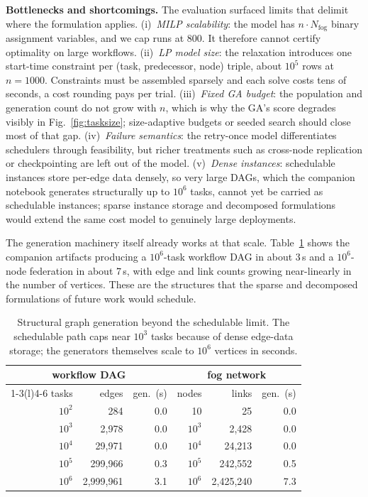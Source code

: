 \documentclass[conference]{IEEEtran}
\begin{document}
\textbf{Bottlenecks and shortcomings.} The evaluation surfaced limits that delimit where the formulation applies. (i)~\emph{MILP scalability}: the model has $n \cdot N_{\mathrm{fog}}$ binary assignment variables, and we cap runs at 800. It therefore cannot certify optimality on large workflows. (ii)~\emph{LP model size}: the relaxation introduces one start-time constraint per (task, predecessor, node) triple, about $10^5$ rows at $n{=}1000$. Constraints must be assembled sparsely and each solve costs tens of seconds, a cost rounding pays per trial. (iii)~\emph{Fixed GA budget}: the population and generation count do not grow with $n$, which is why the GA's score degrades visibly in Fig.~\ref{fig:tasksize}; size-adaptive budgets or seeded search should close most of that gap. (iv)~\emph{Failure semantics}: the retry-once model differentiates schedulers through feasibility, but richer treatments such as cross-node replication or checkpointing are left out of the model. (v)~\emph{Dense instances}: schedulable instances store per-edge data densely, so very large DAGs, which the companion notebook generates structurally up to $10^6$ tasks, cannot yet be carried as schedulable instances; sparse instance storage and decomposed formulations would extend the same cost model to genuinely large deployments.

The generation machinery itself already works at that scale. Table~\ref{tab:structural} shows the companion artifacts producing a $10^6$-task workflow DAG in about 3\,s and a $10^6$-node federation in about 7\,s, with edge and link counts growing near-linearly in the number of vertices. These are the structures that the sparse and decomposed formulations of future work would schedule.

\begin{table}[t]
\centering
\caption{Structural graph generation beyond the schedulable limit.
The schedulable path caps near $10^3$ tasks because of dense edge-data
storage; the generators themselves scale to $10^6$ vertices in seconds.}
\label{tab:structural}
\small
\begin{tabular}{rrr rrr}
\toprule
\multicolumn{3}{c}{workflow DAG} & \multicolumn{3}{c}{fog network}\\
\cmidrule(r){1-3}\cmidrule(l){4-6}
tasks & edges & gen.\ (s) & nodes & links & gen.\ (s)\\
\midrule
$10^2$ & 284           & 0.0 & 10    & 25           & 0.0 \\
$10^3$ & 2{,}978       & 0.0 & $10^3$ & 2{,}428      & 0.0 \\
$10^4$ & 29{,}971      & 0.0 & $10^4$ & 24{,}213     & 0.0 \\
$10^5$ & 299{,}966     & 0.3 & $10^5$ & 242{,}552    & 0.5 \\
$10^6$ & 2{,}999{,}961 & 3.1 & $10^6$ & 2{,}425{,}240& 7.3 \\
\bottomrule
\end{tabular}
\end{table}
\end{document}
